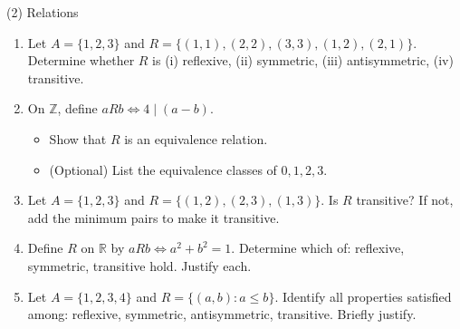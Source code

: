 \documentclass[12pt]{article}
\begin{document}
\begin{sectbox}{(2) Relations}
\begin{enumerate}[label=\textbf{R\arabic*:}]
\item Let $A=\{1,2,3\}$ and $R=\{(1,1),(2,2),(3,3),(1,2),(2,1)\}$. Determine whether $R$ is (i) reflexive, (ii) symmetric, (iii) antisymmetric, (iv) transitive.

\item On $\mathbb{Z}$, define $aRb\iff 4\mid(a-b)$. \begin{itemize}
    \item Show that $R$ is an equivalence relation.
    \item (Optional) List the equivalence classes of $0,1,2,3$.
\end{itemize} 

\item Let $A=\{1,2,3\}$ and $R=\{(1,2),(2,3),(1,3)\}$. Is $R$ transitive? If not, add the minimum pairs to make it transitive.

\item Define $R$ on $\mathbb{R}$ by $aRb\iff a^2+b^2=1$. Determine which of: reflexive, symmetric, transitive hold. Justify each.

\item Let $A=\{1,2,3,4\}$ and $R=\{(a,b):a\le b\}$. Identify all properties satisfied among: reflexive, symmetric, antisymmetric, transitive. Briefly justify.
\end{enumerate}
\end{sectbox}
\end{document}
